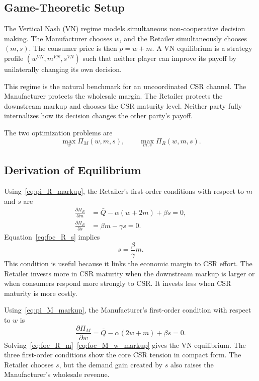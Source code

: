 \subsection{Game-Theoretic Setup}

The Vertical Nash (VN) regime models simultaneous non-cooperative decision making. The Manufacturer chooses $w$, and the Retailer simultaneously chooses $(m,s)$. The consumer price is then $p=w+m$. A VN equilibrium is a strategy profile $(w^{VN},m^{VN},s^{VN})$ such that neither player can improve its payoff by unilaterally changing its own decision.

This regime is the natural benchmark for an uncoordinated CSR channel. The Manufacturer protects the wholesale margin. The Retailer protects the downstream markup and chooses the CSR maturity level. Neither party fully internalizes how its decision changes the other party's payoff.

The two optimization problems are
\begin{equation*}
    \max_w \Pi_M(w,m,s),
    \qquad
    \max_{m,s}\Pi_R(w,m,s).
\end{equation*}

\subsection{Derivation of Equilibrium}

Using~\eqref{eq:pi_R_markup}, the Retailer's first-order conditions with respect to $m$ and $s$ are
\begin{align}
    \frac{\partial \Pi_R}{\partial m}
    &=\bar{Q}-\alpha(w+2m)+\beta s=0,
    \label{eq:foc_R_m}\\
    \frac{\partial \Pi_R}{\partial s}
    &=\beta m-\gamma s=0.
    \label{eq:foc_R_s}
\end{align}
Equation~\eqref{eq:foc_R_s} implies
\begin{equation*}
    s=\frac{\beta}{\gamma}m.
\end{equation*}
This condition is useful because it links the economic margin to CSR effort. The Retailer invests more in CSR maturity when the downstream markup is larger or when consumers respond more strongly to CSR. It invests less when CSR maturity is more costly.

Using~\eqref{eq:pi_M_markup}, the Manufacturer's first-order condition with respect to $w$ is
\begin{equation}
    \frac{\partial \Pi_M}{\partial w}
    =\bar{Q}-\alpha(2w+m)+\beta s=0.
    \label{eq:foc_M_w_markup}
\end{equation}
Solving~\eqref{eq:foc_R_m}--\eqref{eq:foc_M_w_markup} gives the VN equilibrium. The three first-order conditions show the core CSR tension in compact form. The Retailer chooses $s$, but the demand gain created by $s$ also raises the Manufacturer's wholesale revenue.

